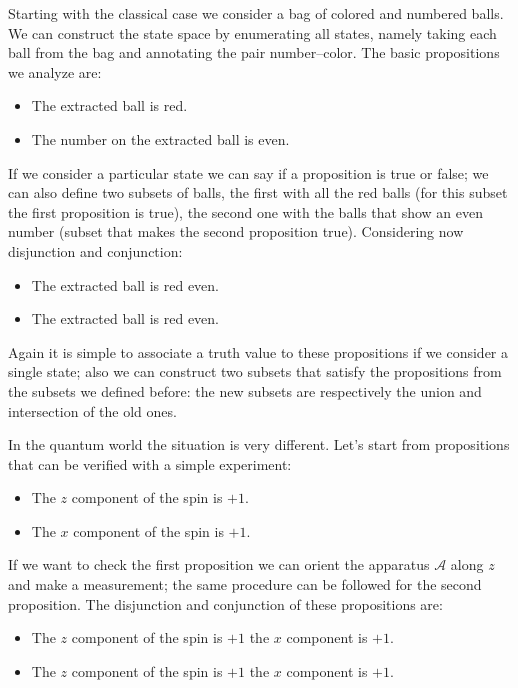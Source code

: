 Starting with the classical case we consider a bag of colored and numbered balls. We can construct the state space by enumerating all states, namely taking each ball from the bag and annotating the pair number–color. The basic propositions we analyze are:
\begin{itemize}
	\item The extracted ball is red.
	\item The number on the extracted ball is even.
\end{itemize}

If we consider a particular state we can say if a proposition is true or false; we can also define two subsets of balls, the first with all the red balls (for this subset the first proposition is true), the second one with the balls that show an even number (subset that makes the second proposition true). Considering now disjunction and conjunction:
\begin{itemize}
	\item The extracted ball is red  even.
	\item The extracted ball is red  even.
\end{itemize}
Again it is simple to associate a truth value to these propositions if we consider a single state; also we can construct two subsets that satisfy the propositions from the subsets we defined before: the new subsets are respectively the union and intersection of the old ones.

In the quantum world the situation is very different. Let's start from propositions that can be verified with a simple experiment:
\begin{itemize}
	\item The $z$ component of the spin is $+1$.
	\item The $x$ component of the spin is $+1$.
\end{itemize}
If we want to check the first proposition we can orient the apparatus $\mathcal{A}$ along $z$ and make a measurement; the same procedure can be followed for the second proposition. The disjunction and conjunction of these propositions are:
\begin{itemize}
	\item The $z$ component of the spin is $+1$  the $x$ component is $+1$.
	\item The $z$ component of the spin is $+1$  the $x$ component is $+1$.
\end{itemize}

